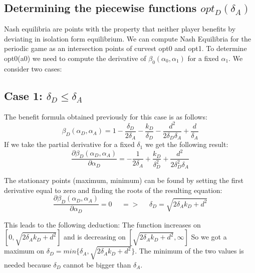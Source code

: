 \subsection{Determining the piecewise functions $opt_{D}(\delta_{A})$}

Nash equilibria are points with the property that neither player benefits by deviating in isolation form equilibrium. We can compute Nash Equilibria for the periodic game as an intersection points of curvest opt0 and opt1. To determine opt0(a0) we need to compute the derivative of  $\beta_{0}(\alpha_{0},\alpha_{1}) $ for a fixed $\alpha_{1}$. We consider two cases:\\

\subsection*{Case 1: $\delta_{D} \leq \delta_{A} $}
The benefit formula obtained previously for this case is as follows:
\begin{equation*}
\beta_{D}(\alpha_{D},\alpha_{A}) = 1 - \dfrac{\delta_{D}}{2\delta_{A}} - \dfrac{k_{D}}{\delta_{D}} - \dfrac{d^{2}}{2\delta_{D}\delta_{A}} + \dfrac{d}{\delta_{A}}
\end{equation*}
If we take the partial derivative for a fixed $\delta_{1}$ we get the following result:
\begin{equation*}\label{formdelta}
\frac{\partial \beta_{D}(\alpha_{D},\alpha_{A})}{\partial \alpha_{D}} = - \dfrac{1}{2\delta_{A}} + \dfrac{k_{D}}{\delta_{D}^{2}} + \dfrac{d^{2}}{2\delta_{D}^{2}\delta_{A}}
\end{equation*}

The stationary points (maximum, minimum) can be found by setting the first derivative equal to zero and finding the roots of the resulting equation:
\begin{equation*}
\frac{\partial \beta_{D}(\alpha_{D},\alpha_{A})}{\partial \alpha_{D}} =0 ~~~~~~ =>~~~~~~ \delta_{D} = \sqrt{2\delta_{A}k_{D} + d^{2}}
\end{equation*}

This leads to the following deduction: The function increases on $[0, \sqrt{2\delta_{A}k_{D} + d^{2}}]$ and is decreasing on $[\sqrt{2\delta_{A}k_{D} + d^{2}}, \infty]$ So we got a maximum on $\delta_{D} = min \{ \delta_{A}, \sqrt{2\delta_{A}k_{D} + d^{2}} \} $. The minimum of the two values is needed because $\delta_{D}$ cannot be bigger than $\delta_{A}$. \\
~~\\



